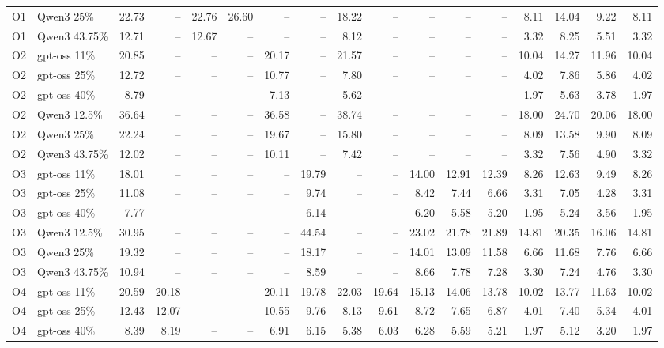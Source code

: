 \begin{table}[t]
\begin{tabular}{@{}llrr|rrrrrr|rrr|r|rrr@{}}
O1 & Qwen3 25\% & 22.73 & -- & 22.76 & 26.60 & -- & -- & 18.22 & -- & -- & -- & -- & 8.11 & 14.04 & 9.22 & 8.11 \\
O1 & Qwen3 43.75\% & 12.71 & -- & 12.67 & -- & -- & -- & 8.12 & -- & -- & -- & -- & 3.32 & 8.25 & 5.51 & 3.32 \\
O2 & gpt-oss 11\% & 20.85 & -- & -- & -- & 20.17 & -- & 21.57 & -- & -- & -- & -- & 10.04 & 14.27 & 11.96 & 10.04 \\
O2 & gpt-oss 25\% & 12.72 & -- & -- & -- & 10.77 & -- & 7.80 & -- & -- & -- & -- & 4.02 & 7.86 & 5.86 & 4.02 \\
O2 & gpt-oss 40\% & 8.79 & -- & -- & -- & 7.13 & -- & 5.62 & -- & -- & -- & -- & 1.97 & 5.63 & 3.78 & 1.97 \\
O2 & Qwen3 12.5\% & 36.64 & -- & -- & -- & 36.58 & -- & 38.74 & -- & -- & -- & -- & 18.00 & 24.70 & 20.06 & 18.00 \\
O2 & Qwen3 25\% & 22.24 & -- & -- & -- & 19.67 & -- & 15.80 & -- & -- & -- & -- & 8.09 & 13.58 & 9.90 & 8.09 \\
O2 & Qwen3 43.75\% & 12.02 & -- & -- & -- & 10.11 & -- & 7.42 & -- & -- & -- & -- & 3.32 & 7.56 & 4.90 & 3.32 \\
O3 & gpt-oss 11\% & 18.01 & -- & -- & -- & -- & 19.79 & -- & -- & 14.00 & 12.91 & 12.39 & 8.26 & 12.63 & 9.49 & 8.26 \\
O3 & gpt-oss 25\% & 11.08 & -- & -- & -- & -- & 9.74 & -- & -- & 8.42 & 7.44 & 6.66 & 3.31 & 7.05 & 4.28 & 3.31 \\
O3 & gpt-oss 40\% & 7.77 & -- & -- & -- & -- & 6.14 & -- & -- & 6.20 & 5.58 & 5.20 & 1.95 & 5.24 & 3.56 & 1.95 \\
O3 & Qwen3 12.5\% & 30.95 & -- & -- & -- & -- & 44.54 & -- & -- & 23.02 & 21.78 & 21.89 & 14.81 & 20.35 & 16.06 & 14.81 \\
O3 & Qwen3 25\% & 19.32 & -- & -- & -- & -- & 18.17 & -- & -- & 14.01 & 13.09 & 11.58 & 6.66 & 11.68 & 7.76 & 6.66 \\
O3 & Qwen3 43.75\% & 10.94 & -- & -- & -- & -- & 8.59 & -- & -- & 8.66 & 7.78 & 7.28 & 3.30 & 7.24 & 4.76 & 3.30 \\
O4 & gpt-oss 11\% & 20.59 & 20.18 & -- & -- & 20.11 & 19.78 & 22.03 & 19.64 & 15.13 & 14.06 & 13.78 & 10.02 & 13.77 & 11.63 & 10.02 \\
O4 & gpt-oss 25\% & 12.43 & 12.07 & -- & -- & 10.55 & 9.76 & 8.13 & 9.61 & 8.72 & 7.65 & 6.87 & 4.01 & 7.40 & 5.34 & 4.01 \\
O4 & gpt-oss 40\% & 8.39 & 8.19 & -- & -- & 6.91 & 6.15 & 5.38 & 6.03 & 6.28 & 5.59 & 5.21 & 1.97 & 5.12 & 3.20 & 1.97 \\

\end{tabular}
\end{table}

